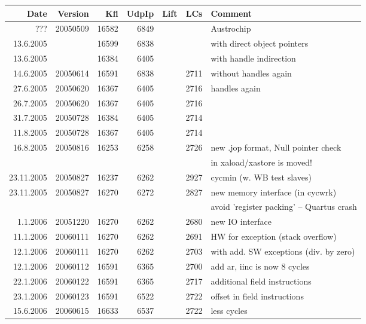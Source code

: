 \documentclass[a4paper,12pt]{scrartcl}
\begin{document}
\begin{table}
    \centering

    \begin{tabular}{rrrrrrl}
        \toprule
        Date & Version & Kfl & UdpIp & Lift & LCs & Comment \\
        \midrule
        ??? & 20050509 & 16582 & 6849 & &  & Austrochip \\
        13.6.2005 & & 16599 & 6838 & &  & with direct object pointers \\
        13.6.2005 & & 16384 & 6405 & &  & with handle indirection \\
        14.6.2005 & 20050614 & 16591 & 6838 & & 2711 & without
        handles again \\
        27.6.2005 & 20050620 & 16367 & 6405 & & 2716 & handles again \\
        26.7.2005 & 20050620 & 16367 & 6405 & & 2716 & \\
        31.7.2005 & 20050728 & 16384 & 6405 & & 2714 & \\
        11.8.2005 & 20050728 & 16367 & 6405 & & 2714 & \\
        16.8.2005 & 20050816 & 16253 & 6258 & & 2726 & new .jop format, Null pointer check \\
        & & & & & &in xaload/xastore is moved! \\
        23.11.2005 & 20050827 & 16237 & 6262 & & 2927 & cycmin (w. WB test slaves) \\
        23.11.2005 & 20050827 & 16270 & 6272 & & 2827 & new memory interface (in cycwrk) \\
        & & & & & & avoid 'register packing' -- Quartus crash \\
        1.1.2006 & 20051220 & 16270 & 6262 & & 2680 & new IO interface \\
        11.1.2006 & 20060111 & 16270 & 6262 & & 2691 & HW for exception (stack
        overflow)\\
        12.1.2006 & 20060111 & 16270 & 6262 & & 2703 & with add. SW
        exceptions (div. by zero)\\
        12.1.2006 & 20060112 & 16591 & 6365 & & 2700 & add ar, iinc
        is now 8 cycles\\
        22.1.2006 & 20060122 & 16591 & 6365 & & 2717 & additional field instructions \\
        23.1.2006 & 20060123 & 16591 & 6522 & & 2722 & offset in field instructions \\
        15.6.2006 & 20060615 & 16633 & 6537 & & 2722 & less cycles

\end{tabular}
\end{table}
\end{document}
